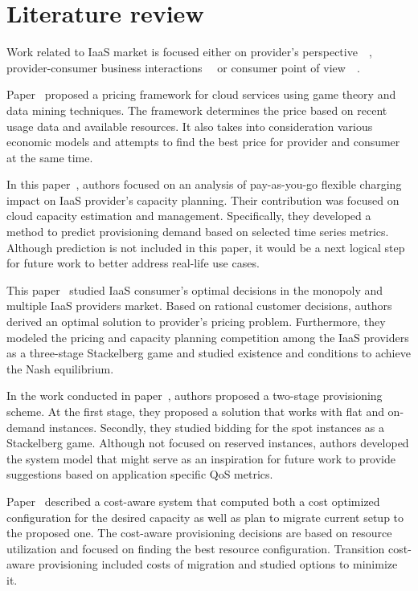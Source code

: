 \documentclass[]{final_report}
\begin{document}
\section{Literature review}

Work related to IaaS market is focused either on provider's perspective~\cite{6274129}~\cite{6253563}, provider-consumer business interactions~\cite{6676685}~\cite{6963393} or consumer point of view~\cite{5961733}~\cite{6295066}. 

Paper~\cite{6253563} proposed a pricing framework for cloud services using game theory and data mining techniques. The framework determines the price based on recent usage data and available resources. It also takes into consideration various economic models and attempts to find the best price for provider and consumer at the same time.

In this paper~\cite{6274129}, authors focused on an analysis of pay-as-you-go flexible charging impact on IaaS provider's capacity planning. Their contribution was focused on cloud capacity estimation and management. Specifically, they developed a method to predict provisioning demand based on selected time series metrics. 
Although prediction is not included in this paper, it would be a next logical step for future work to better address real-life use cases. 

This paper~\cite{6963393} studied IaaS consumer's optimal decisions in the monopoly and multiple IaaS providers market. Based on rational customer decisions, authors derived an optimal solution to provider's pricing problem. Furthermore, they modeled the pricing and capacity planning competition among the IaaS providers as a three-stage Stackelberg game and studied existence and conditions to achieve the Nash equilibrium. 

In the work conducted in paper~\cite{6676685}, authors proposed a two-stage provisioning scheme. At the first stage, they proposed a solution that works with flat and on-demand instances. Secondly, they studied bidding for the spot instances as a Stackelberg game. Although not focused on reserved instances, authors developed the system model that might serve as an inspiration for future work to provide suggestions based on application specific QoS metrics. 


Paper~\cite{5961733} described a cost-aware system that computed both a cost optimized configuration for the desired capacity as well as plan to migrate current setup to the proposed one. The cost-aware provisioning decisions are based on resource utilization and focused on finding the best resource configuration. Transition cost-aware provisioning included costs of migration and studied options to minimize it. 
\end{document}
